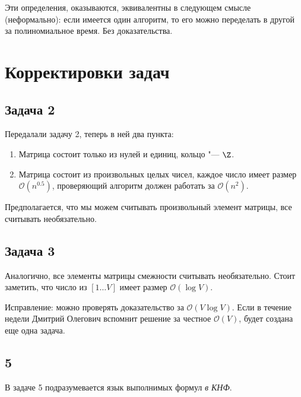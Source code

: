 \begin{Rem}
	Эти определения, оказываются, эквивалентны в следующем смысле (неформально):
	если имеется один алгоритм, то его можно переделать в другой за полиномиальное время.
	Без доказательства.
\end{Rem}

\section{Корректировки задач}
\subsection{Задача 2}
	Передалали задачу 2, теперь в ней два пункта:
	\begin{enumerate}
		\item Матрица состоит только из нулей и единиц, кольцо "--- $\Z$.
		\item
			Матрица состоит из произвольных целых чисел, каждое число имеет размер $\mathcal O(n^{0.5})$,
			проверяющий алгоритм должен работать за $\mathcal O(n^2)$.
	\end{enumerate}
	Предполагается, что мы можем считывать произвольный элемент матрицы, все считывать необязательно.

\subsection{Задача 3}
	Аналогично, все элементы матрицы смежности считывать необязательно.
	Стоит заметить, что число из $[1\dots V]$ имеет размер $\mathcal O(\log V)$.

	Исправление: можно проверять доказательство за $\mathcal O(V \log V)$.
	Если в течение недели Дмитрий Олегович вспомнит решение за честное $\mathcal O(V)$, будет создана еще одна задача.

\subsection{5}
	В задаче 5 подразумевается язык выполнимых формул \textit{в КНФ}.
